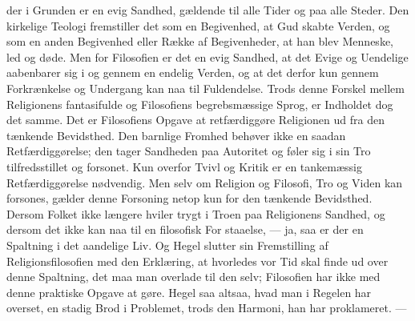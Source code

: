 \documentclass[12pt,a4paper,openany]{book}
\newcommand{\opage}[1]{\marginnote{\footnotesize\textit{[#1]}}}
\begin{document}
der i Grunden er en evig Sandhed, gældende til alle Tider og paa
alle Steder. Den kirkelige Teologi fremstiller det som en Begivenhed,
at Gud skabte Verden, og som en anden Begivenhed eller Række af
Begivenheder, at han blev Menneske, led og døde. Men for Filosofien
er det en evig Sandhed, at det Evige og Uendelige aabenbarer sig
i og gennem en endelig Verden, og at det derfor kun gennem Forkrænkelse
og Undergang kan naa til Fuldendelse. Trods denne Forskel
mellem Religionens fantasifulde og Filosofiens begrebsmæssige
Sprog, er Indholdet dog det samme. Det er Filosofiens Opgave at
retfærdiggøre Religionen ud fra den tænkende Bevidsthed. Den barnlige
Fromhed behøver ikke en saadan Retfærdiggørelse; den tager
Sandheden paa Autoritet og føler sig i sin Tro tilfredsstillet og forsonet.
Kun overfor Tvivl og Kritik er en tankemæssig Retfærdiggørelse
nødvendig. Men selv om Religion og Filosofi, Tro og Viden kan
forsones, gælder denne Forsoning netop kun for den tænkende Bevidsthed.
Dersom Folket ikke længere hviler trygt i Troen paa Religionens
Sandhed, og dersom det ikke kan naa til en filosofisk For%
\opage{126}staaelse, --- ja, saa er der en Spaltning i det aandelige Liv. Og Hegel
slutter sin Fremstilling af Religionsfilosofien med den Erklæring, at
hvorledes vor Tid skal finde ud over denne Spaltning, det maa man
overlade til den selv; Filosofien har ikke med denne praktiske Opgave
at gøre. Hegel saa altsaa, hvad man i Regelen har overset, en stadig
Brod i Problemet, trods den Harmoni, han har proklameret. ---
\end{document}
